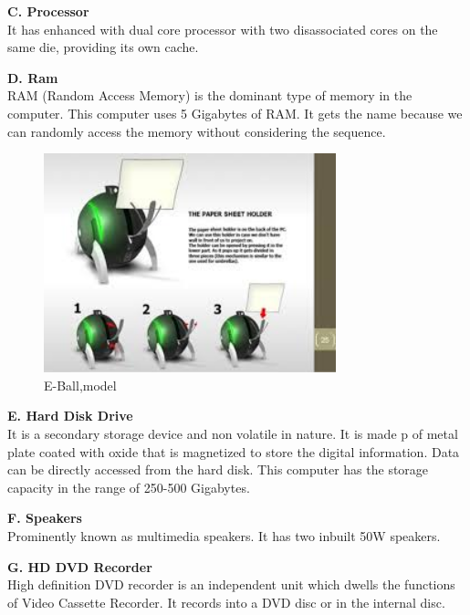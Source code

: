 \documentclass{article}
\begin{document}
  \textbf{C. Processor}\\ 
  It has enhanced with dual core processor with two disassociated cores on the same die, providing its own cache.
  
   \textbf{D. Ram}\\
    RAM (Random Access Memory) is the dominant type of memory in the computer. This computer uses 5 Gigabytes of RAM. It gets the name because we can randomly access the memory without considering the sequence.
   \newpage
   \begin{figure}[h]
\centering
\includegraphics[height=2.5in]{index21.jpg}
\caption[optional caption]{E-Ball,model}
\label{fig1: E-Ball model}
\end{figure}
   \textbf{ E. Hard Disk Drive}\\
     It is a secondary storage device and non volatile in nature. It is made p of metal plate coated with oxide that is magnetized to store the digital information. Data can be directly accessed from the hard disk. This computer has the storage capacity in the range of 250-500 Gigabytes.
    
    \textbf{F. Speakers}\\
      Prominently known as multimedia speakers. It has two inbuilt 50W speakers.
     
    \textbf{G. HD DVD Recorder}\\
       High definition DVD recorder is an independent unit which dwells the functions of Video Cassette Recorder. It records into a DVD disc or in the internal disc.
      
\end{document}
